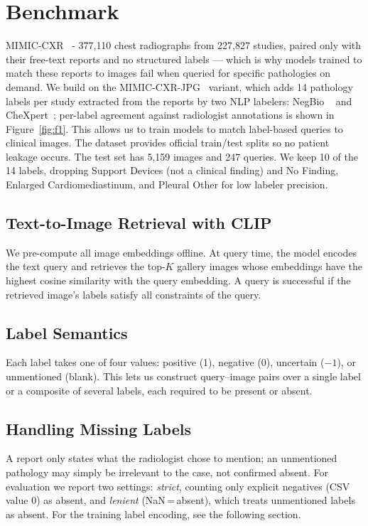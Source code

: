 \documentclass[10pt,twocolumn,letterpaper]{article}
\begin{document}
\section{Benchmark}

MIMIC-CXR~\cite{PhysioNet-mimic-cxr-2.1.0} - 377{,}110 chest
radiographs from 227{,}827 studies, paired only with their free-text reports
and no structured labels --- which is why models trained to match these reports
to images fail when queried for specific pathologies on demand. We build on the
MIMIC-CXR-JPG~\cite{johnson2019mimicjpg} variant, which adds 14 pathology labels
per study extracted from the reports by two NLP labelers: NegBio ~\cite{peng2017negbiohighperformancetoolnegation} and CheXpert~\cite{irvin2019chexpert};
per-label agreement against radiologist annotations is shown in
Figure~\ref{fig:f1}. This allows us to train models to match label-based queries to clinical images.
The dataset provides official train/test splits so no patient leakage occurs.
The test set has 5{,}159 images and 247 queries.
We keep 10 of the 14 labels, dropping Support Devices
(not a clinical finding) and No Finding, Enlarged Cardiomediastinum, and
Pleural Other for low labeler precision.

\subsection{Text-to-Image Retrieval with CLIP}
We pre-compute all image embeddings offline. At query time, the model encodes the text query and retrieves the top-$K$ gallery images whose embeddings have the highest cosine similarity with the query embedding. A query is successful if the retrieved image's labels satisfy all constraints of the query.

\subsection{Label Semantics}
Each label takes one of four values: positive (1), negative (0), uncertain
($-1$), or unmentioned (blank). 
This lets us construct query--image pairs over a single label or a composite of several labels, each required to be present or absent.

\subsection{Handling Missing Labels}
A report only states what the radiologist chose to mention; an unmentioned pathology may simply be irrelevant to the case, not confirmed absent.
For evaluation we report two settings: \emph{strict}, counting only explicit negatives (CSV value 0) as absent, and \emph{lenient} (NaN\,=\,absent), which treats unmentioned labels as absent.
For the training label encoding, see the following section.
\end{document}
